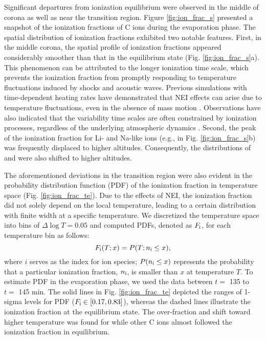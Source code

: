 \documentclass[fleqn,usenatbib]{mnras}
\begin{document}
Significant departures from ionization equilibrium were observed in the middle of corona as well as near the transition region. 
Figure \ref{fig:ion_frac_s} presented a snapshot of the ionization fractions of C ions during the evaporation phase. 
The spatial distribution of ionization fractions exhibited two notable features.
First, in the middle corona, the spatial profile of ionization fractions appeared considerably smoother than that in the equilibrium state (Fig. \ref{fig:ion_frac_s}a). 
This phenomenon can be attributed to the longer ionization time scale, which prevents the ionization fraction from promptly responding to temperature fluctuations induced by shocks and acoustic waves. 
Previous simulations with time-dependent heating rates have demonstrated that NEI effects can arise due to temperature fluctuations, even in the absence of mass motion \citep{1982ApJ...255..783M}. 
Observations have also indicated that the variability time scales are often constrained by ionization processes, regardless of the underlying atmospheric dynamics \citep{1989SoPh..122..245G}.
Second, the peak of the ionization fraction for Li- and Na-like ions (e.g.,  in Fig. \ref{fig:ion_frac_s}b) was frequently displaced to higher altitudes. 
Consequently, the distributions of  and  were also shifted to higher altitudes.

The aforementioned deviations in the transition region were also evident in the probability distribution function (PDF) of the ionization fraction in temperature space (Fig. \ref{fig:ion_frac_te}).
Due to the effects of NEI, the ionization fraction did not solely depend on the local temperature, leading to a certain distribution with finite width at a specific temperature.
We discretized the temperature space into bins of $\Delta \log T = 0.05$ and computed PDFs, denoted as $F_{\rm i}$, for each temperature bin as follows:
\begin{equation}
F_{\rm i}(T;x) = P(T; n_{\rm i} \le x),
\end{equation}
where $i$ serves as the index for ion species;
$P(n_{\rm i} \le x)$ represents the probability that a particular ionization fraction, $n_{\rm i}$, is smaller than $x$ at temperature $T$.
To estimate PDF in the evaporation phase, we used the data between $t=$ 135 to $t=$ 145 min.
The solid lines in Fig. \ref{fig:ion_frac_te} depicted the ranges of 1-sigma levels for PDF ($F_{\rm i} \in [0.17,0.83]$), whereas the dashed lines illustrate the ionization fraction at the equilibrium state.
The over-fraction and shift toward higher temperature was found for  while other C ions almost followed the ionization fraction in equilibrium.
\end{document}
